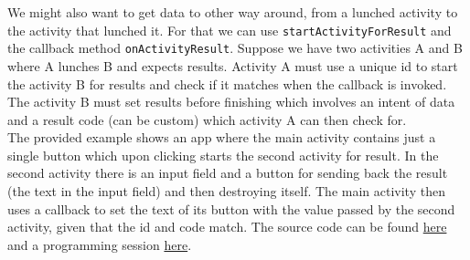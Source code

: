 We might also want to get data to other way around, from a lunched activity to the activity that lunched it. For that we can use \texttt{startActivityForResult} and the callback method \texttt{onActivityResult}. Suppose we have two activities A and B where A lunches B and expects results. Activity A must use a unique id to start the activity B for results and check if it matches when the callback is invoked. The activity B must set results before finishing which involves an intent of data and a result code (can be custom) which activity A can then check for.\\

The provided example shows an app where the main activity contains just a single button which upon clicking starts the second activity for result. In the second activity there is an input field and a button for sending back the result (the text in the input field) and then destroying itself. The main activity then uses a callback to set the text of its button with the value passed by the second activity, given that the id and code match. The source code can be found \href{https://github.com/JonSteinn/AndroidDevelopment/tree/master/examples/lab3/activityforresult}{here} and a programming session \href{https://youtu.be/4QhpnO6NMuo}{here}.

